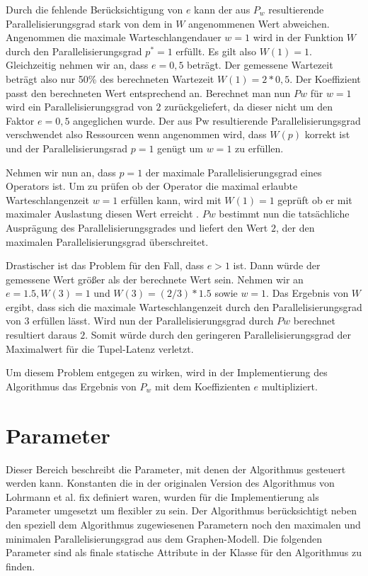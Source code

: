 Durch die fehlende Berücksichtigung von \(e\) kann der aus \(P_w\) resultierende Parallelisierungsgrad stark von dem in \(W\) angenommenen Wert abweichen. 
Angenommen die maximale Warteschlangendauer \(w = 1 \) wird in der Funktion \(W\) durch den Parallelisierungsgrad \(p^\ast = 1\) erfüllt. 
Es gilt also \(W(1)=1\).
Gleichzeitig nehmen wir an, dass \(e = 0,5\) beträgt. 
Der gemessene Wartezeit beträgt also nur 50\% des berechneten Wartezeit \(W(1) = 2 * 0,5\).
Der Koeffizient passt den berechneten Wert entsprechend an.
Berechnet man nun \(Pw\) für \(w = 1\) wird ein Parallelisierungsgrad von \(2\) zurückgeliefert, da dieser nicht um den Faktor \(e = 0,5\) angeglichen wurde. 
Der aus Pw resultierende Parallelisierungsgrad verschwendet also Ressourcen wenn angenommen wird, dass \(W(p)\) korrekt ist und der Parallelisierungsrad \(p=1\) genügt um \(w = 1\) zu erfüllen.

Nehmen wir nun an, dass \(p=1\) der maximale Parallelisierungsgrad eines Operators ist.
Um zu prüfen ob der Operator die maximal erlaubte Warteschlangenzeit \(w=1\) erfüllen kann, wird mit \(W(1) = 1\) geprüft ob er mit maximaler Auslastung diesen Wert erreicht . 
\(Pw\) bestimmt nun die tatsächliche Ausprägung des Parallelisierungsgrades und liefert den Wert \(2\), der den maximalen Parallelisierungsgrad überschreitet.

Drastischer ist das Problem für den Fall, dass \(e > 1\) ist. 
Dann würde der gemessene Wert größer als der berechnete Wert sein. 
Nehmen wir an \(e = 1.5, W(3)=1\) und \(W(3) = (2/3) * 1.5\) sowie \(w=1\). 
Das Ergebnis von \(W\) ergibt, dass sich die maximale Warteschlangenzeit durch den Parallelisierungsgrad von 3 erfüllen lässt. 
Wird nun der Parallelisierungsgrad durch \(Pw\) berechnet resultiert daraus \(2\). 
Somit würde durch den geringeren Parallelisierungsgrad der Maximalwert für die Tupel-Latenz verletzt.

Um diesem Problem entgegen zu wirken, wird in der Implementierung des Algorithmus das Ergebnis von \(P_w\) mit dem Koeffizienten \(e\) multipliziert.

\section{Parameter}

Dieser Bereich beschreibt die Parameter, mit denen der Algorithmus gesteuert werden kann.
Konstanten die in der originalen Version des Algorithmus von Lohrmann et al. fix definiert waren, wurden für die Implementierung als Parameter umgesetzt um flexibler zu sein.
Der Algorithmus berücksichtigt neben den speziell dem Algorithmus zugewiesenen Parametern noch den maximalen und minimalen Parallelisierungsgrad aus dem Graphen-Modell.
Die folgenden Parameter sind als finale statische Attribute in der Klasse für den Algorithmus zu finden.

